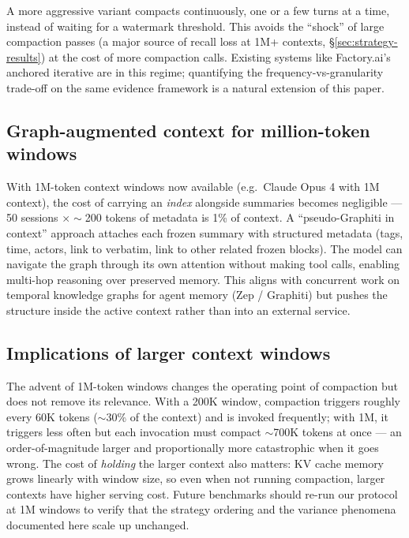 A more aggressive variant compacts continuously, one or a few turns at a
time, instead of waiting for a watermark threshold. This avoids the
``shock'' of large compaction passes (a major source of recall loss at 1M+
contexts, \S\ref{sec:strategy-results}) at the cost of more compaction calls. Existing systems like
Factory.ai's anchored iterative are in this regime; quantifying the
frequency-vs-granularity trade-off on the same evidence framework is a
natural extension of this paper.

\subsection{Graph-augmented context for million-token windows}
\label{sec:graph}

With 1M-token context windows now available (e.g.\ Claude Opus 4 with 1M
context), the cost of carrying an \textit{index} alongside summaries becomes
negligible --- 50 sessions $\times \sim$200 tokens of metadata is 1\% of context.
A ``pseudo-Graphiti in context'' approach attaches each frozen summary with
structured metadata (tags, time, actors, link to verbatim, link to other
related frozen blocks). The model can navigate the graph through its own
attention without making tool calls, enabling multi-hop reasoning over
preserved memory. This aligns with concurrent work on temporal knowledge
graphs for agent memory (Zep / Graphiti) but pushes the structure inside
the active context rather than into an external service.

\subsection{Implications of larger context windows}
\label{sec:large-windows}

The advent of 1M-token windows changes the operating point of compaction
but does not remove its relevance. With a 200K window, compaction triggers
roughly every 60K tokens ($\sim$30\% of the context) and is invoked frequently;
with 1M, it triggers less often but each invocation must compact $\sim$700K
tokens at once --- an order-of-magnitude larger and proportionally more
catastrophic when it goes wrong. The cost of \textit{holding} the larger context
also matters: KV cache memory grows linearly with window size, so even
when not running compaction, larger contexts have higher serving cost.
Future benchmarks should re-run our protocol at 1M windows to verify that
the strategy ordering and the variance phenomena documented here scale up
unchanged.

